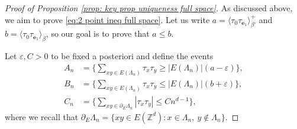 \documentclass[11pt,a4paper]{article}
\numberwithin{equation}{section}
\theoremstyle{plain}
\theoremstyle{definition}
\begin{document}
\begin{proof}[Proof of Proposition \textup{\ref{prop: key prop uniqueness full space}}]

As discussed above, we aim to prove \eqref{eq:2 point ineq full space}. Let us write $a=\langle \tau_0 \tau_{\mathbf{e}_1} \rangle^+_{\beta'}$ and $b=\langle \tau_0 \tau_{\mathbf{e}_1}\rangle_{\beta}$, so our goal is to prove that $a\leq b$. 

 
Let $\varepsilon,C>0$ to be fixed a posteriori and define the events \begin{align}
A_n&= \Big\{ \sum_{xy\in E(\Lambda_n)} \tau_x\tau_y \geq |E(\Lambda_n)|(a-\varepsilon) \Big\}, \\
B_n&= \Big\{ \sum_{xy\in E(\Lambda_n)} \tau_x\tau_y \leq |E(\Lambda_n)|(b+\varepsilon) \Big\}, \\
C_n&=\Big\{\sum_{xy\in \partial_E \Lambda_n} |\tau_x \tau_y|\leq Cn^{d-1}\Big\},
\end{align}
where we recall that $\partial_E\Lambda_n=\{xy\in E(\mathbb Z^d) : x\in \Lambda_n, \: y\notin \Lambda_n\}$. 


\end{proof}
\end{document}
